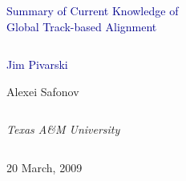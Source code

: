 \documentclass[compress]{beamer}
\begin{document}
\begin{frame}
\vfill
\begin{center}
\textcolor{darkblue}{\Large Summary of Current Knowledge of \\ \vspace{0.2 cm} Global Track-based Alignment}

\vfill
\begin{columns}
\begin{center}
\large
\textcolor{darkblue}{Jim Pivarski}

\vspace{0.2 cm}
Alexei Safonov
\end{center}
\end{columns}

\begin{columns}
\begin{center}
\scriptsize
{\it Texas A\&M University}
\end{center}
\end{columns}

\vfill
20 March, 2009

\end{center}
\end{frame}


\small
\end{document}
